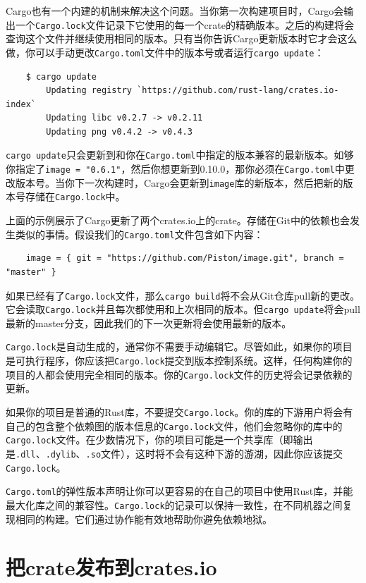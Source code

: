 Cargo也有一个内建的机制来解决这个问题。当你第一次构建项目时，Cargo会输出一个\texttt{Cargo.lock}文件记录下它使用的每一个crate的精确版本。之后的构建将会查询这个文件并继续使用相同的版本。只有当你告诉Cargo更新版本时它才会这么做，你可以手动更改\texttt{Cargo.toml}文件中的版本号或者运行\texttt{cargo update}：
\begin{verbatim}
    $ cargo update
        Updating registry `https://github.com/rust-lang/crates.io-index`
        Updating libc v0.2.7 -> v0.2.11
        Updating png v0.4.2 -> v0.4.3
\end{verbatim}

\texttt{cargo update}只会更新到和你在\texttt{Cargo.toml}中指定的版本兼容的最新版本。如够你指定了\texttt{image = "0.6.1"}，然后你想更新到0.10.0，那你必须在\texttt{Cargo.toml}中更改版本号。当你下一次构建时，Cargo会更新到\texttt{image}库的新版本，然后把新的版本号存储在\texttt{Cargo.lock}中。

上面的示例展示了Cargo更新了两个crates.io上的crate。存储在Git中的依赖也会发生类似的事情。假设我们的\texttt{Cargo.toml}文件包含如下内容：
\begin{verbatim}
    image = { git = "https://github.com/Piston/image.git", branch = "master" }
\end{verbatim}

如果已经有了\texttt{Cargo.lock}文件，那么\texttt{cargo build}将不会从Git仓库pull新的更改。它会读取\texttt{Cargo.lock}并且每次都使用和上次相同的版本。但\texttt{cargo update}将会pull最新的master分支，因此我们的下一次更新将会使用最新的版本。

\texttt{Cargo.lock}是自动生成的，通常你不需要手动编辑它。尽管如此，如果你的项目是可执行程序，你应该把\texttt{Cargo.lock}提交到版本控制系统。这样，任何构建你的项目的人都会使用完全相同的版本。你的\texttt{Cargo.lock}文件的历史将会记录依赖的更新。

如果你的项目是普通的Rust库，不要提交\texttt{Cargo.lock}。你的库的下游用户将会有自己的包含整个依赖图的版本信息的\texttt{Cargo.lock}文件，他们会忽略你的库中的\texttt{Cargo.lock}文件。在少数情况下，你的项目可能是一个共享库（即输出是\texttt{.dll}、\texttt{.dylib}、\texttt{.so}文件），这时将不会有这种下游的游湖，因此你应该提交\texttt{Cargo.lock}。

\texttt{Cargo.toml}的弹性版本声明让你可以更容易的在自己的项目中使用Rust库，并能最大化库之间的兼容性。\texttt{Cargo.lock}的记录可以保持一致性，在不同机器之间复现相同的构建。它们通过协作能有效地帮助你避免依赖地狱。

\section{把crate发布到crates.io}



















